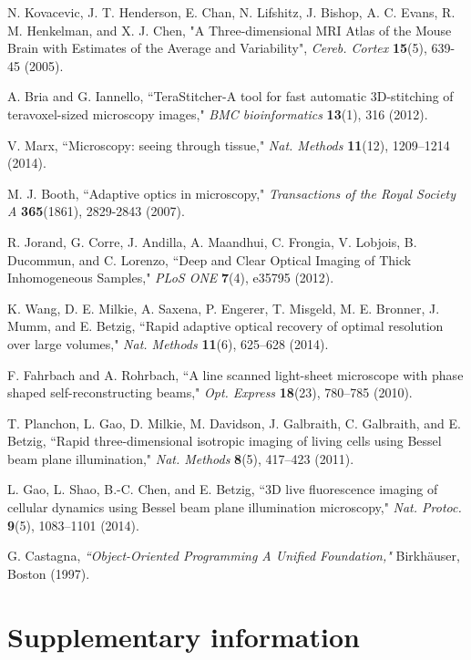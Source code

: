 \documentclass[12pt]{spieman}  %
\begin{document}
\begin{spacing}{2}
\begin{thebibliography}{0}
 N. Kovacevic, J. T. Henderson, E. Chan, N. Lifshitz, J. Bishop, A. C. Evans, R. M. Henkelman, and X. J. Chen, "A Three-dimensional MRI Atlas of the Mouse Brain with Estimates of the Average and Variability", \emph{Cereb. Cortex} \textbf{15}(5), 639-45 (2005).

 A. Bria and G. Iannello,  ``TeraStitcher-A tool for fast automatic 3D-stitching of teravoxel-sized microscopy images,"  \emph{BMC bioinformatics} \textbf{13}(1), 316 (2012).

 V. Marx, ``Microscopy: seeing through tissue," \emph{Nat. Methods} \textbf{11}(12), 1209–1214 (2014).

 M. J. Booth, ``Adaptive optics in microscopy," \emph{Transactions of the Royal Society A} \textbf{365}(1861), 2829-2843 (2007).

 R. Jorand, G. Corre, J. Andilla, A. Maandhui, C. Frongia, V. Lobjois, B. Ducommun, and C. Lorenzo, ``Deep and Clear Optical Imaging of Thick Inhomogeneous Samples," \emph{PLoS ONE} \textbf{7}(4), e35795 (2012).

 K. Wang, D. E. Milkie, A. Saxena, P. Engerer, T. Misgeld, M. E. Bronner, J. Mumm, and E. Betzig, ``Rapid adaptive optical recovery of optimal resolution over large volumes," \emph{Nat. Methods} \textbf{11}(6), 625–628 (2014).

 F. Fahrbach and A. Rohrbach, ``A line scanned light-sheet microscope with phase shaped self-reconstructing beams," \emph{Opt. Express} \textbf{18}(23), 780–785 (2010).

 T. Planchon, L. Gao, D. Milkie, M. Davidson, J. Galbraith, C. Galbraith, and E. Betzig, ``Rapid three-dimensional isotropic imaging of living cells using Bessel beam plane illumination," \emph{Nat. Methods} \textbf{8}(5), 417–423 (2011).

 L. Gao, L. Shao, B.-C. Chen, and E. Betzig, ``3D live fluorescence imaging of cellular dynamics using Bessel beam plane illumination microscopy," \emph{Nat. Protoc.} \textbf{9}(5), 1083–1101 (2014).

 G. Castagna, \emph{``Object-Oriented Programming A Unified Foundation,"} Birkh{\"a}user, Boston (1997).

\end{thebibliography}

\pagebreak
\section{Supplementary information}


\end{spacing}
\end{document}
